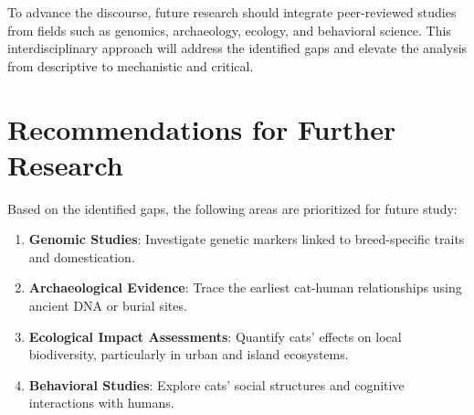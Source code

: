 \documentclass{article}
\begin{document}
To advance the discourse, future research should integrate peer-reviewed studies from fields such as genomics, archaeology, ecology, and behavioral science. This interdisciplinary approach will address the identified gaps and elevate the analysis from descriptive to mechanistic and critical.

\section{Recommendations for Further Research}
Based on the identified gaps, the following areas are prioritized for future study:
\begin{enumerate}
    \item \textbf{Genomic Studies}: Investigate genetic markers linked to breed-specific traits and domestication.
    \item \textbf{Archaeological Evidence}: Trace the earliest cat-human relationships using ancient DNA or burial sites.
    \item \textbf{Ecological Impact Assessments}: Quantify cats' effects on local biodiversity, particularly in urban and island ecosystems.
    \item \textbf{Behavioral Studies}: Explore cats' social structures and cognitive interactions with humans.
\end{enumerate}

\printbibliography
\end{document}
